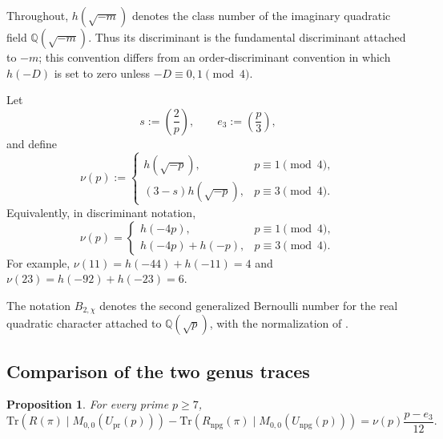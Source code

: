 \documentclass[11pt]{amsart}
\theoremstyle{plain}
\newtheorem{proposition}[theorem]{Proposition}
\theoremstyle{definition}
\newcommand{\Q}{\mathbb{Q}}
\newcommand{\Tr}{\mathrm{Tr}}
\newcommand{\Upr}{U_{\mathrm{pr}}}
\providecommand{\kro}[2]{\left(\frac{#1}{#2}\right)}
\providecommand{\Upr}{U_{\mathrm{pr}}}
\begin{document}
	Throughout, $h(\sqrt{-m})$ denotes the class number of the imaginary
	quadratic field $\Q(\sqrt{-m})$. Thus its discriminant is the fundamental
	discriminant attached to $-m$; this convention differs from an
	order-discriminant convention in which $h(-D)$ is set to zero unless
	$-D\equiv0,1\pmod4$.
	
	Let
	\[
	s:=\kro{2}{p},\qquad e_3:=\kro{p}{3},
	\]
	and define
	\begin{equation}\label{eq:nu-principal}
		\nu(p):=
		\begin{cases}
			h(\sqrt{-p}),&p\equiv1\pmod4,\\
			(3-s)h(\sqrt{-p}),&p\equiv3\pmod4.
		\end{cases}
	\end{equation}
	Equivalently, in discriminant notation,
	\[
	\nu(p)=
	\begin{cases}
		h(-4p),&p\equiv1\pmod4,\\
		h(-4p)+h(-p),&p\equiv3\pmod4.
	\end{cases}
	\]
	For example, $\nu(11)=h(-44)+h(-11)=4$ and
	$\nu(23)=h(-92)+h(-23)=6$.
	
	The notation $B_{2,\chi}$ denotes the second generalized Bernoulli number
	for the real quadratic character attached to $\Q(\sqrt p)$, with the
	normalization of \cite{IbukiyamaKatsura,Ibukiyama2019quinary}.
	
	\subsection{Comparison of the two genus traces}
	\label{ss:trace-comparison}
	
	\begin{proposition}
		\label{prop:genus-trace-comparison}
		For every prime $p\ge7$,
		\begin{equation}\label{eq:genus-trace-difference}
			\Tr\!\left(R(\pi)\mid M_{0,0}(\Upr(p))\right)
			-
			\Tr\!\left(R_{\mathrm{npg}}(\pi)\mid M_{0,0}(U_{\mathrm{npg}}(p))\right)
			=
			\nu(p)\frac{p-e_3}{12}.
		\end{equation}
	\end{proposition}
	
\end{document}
